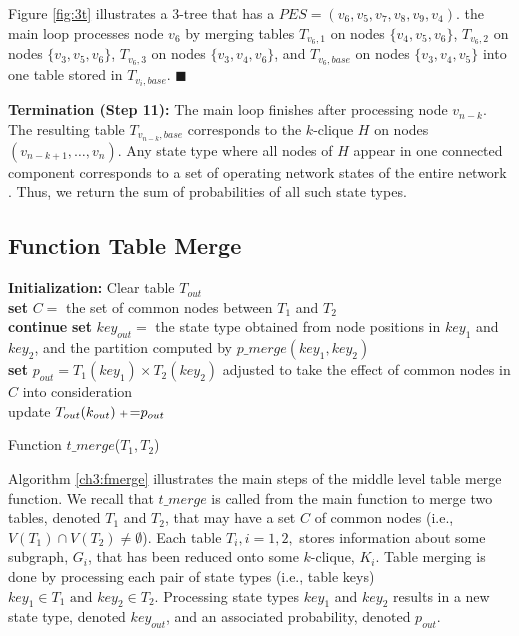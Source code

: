 \begin{example}
\normalfont

Figure \ref{fig:3t} illustrates a 3-tree that has a $PES=(v_6, v_5, v_7, v_8, v_9, v_4)$. the main loop processes node $v_6$ by merging tables $T_{v_6,1}$ on nodes $\{v_4, v_5, v_6\}$, $T_{v_6,2}$ on nodes $\{v_3, v_5, v_6\}$, $T_{v_6,3}$ on nodes $\{v_3, v_4, v_6\}$, and $T_{v_6,base}$ on nodes $\{v_3, v_4, v_5\}$ into one table stored in $T_{v_i,base}$. $\blacksquare$
\end{example}

\textbf{Termination (Step 11):} The main loop finishes after processing node $v_{n-k}$. The resulting table $T_{v_{n-k},base}$  corresponds to the $k$-clique $H$ on nodes $(v_{n-k+1}, \ldots, v_n)$. Any state type where all nodes of $H$ appear in one connected component corresponds to a set of operating network states of the entire network . Thus, we return the sum of probabilities of all such state types.


\subsection{Function Table Merge}
\label{subsub:Mrg}
\begin{algorithm}[htbd]
\Indm  
{}
\nwline
\Indp
\nl \textbf{Initialization:} Clear table $T_{out}$\\
\nl \textbf{set} $C=$ the set of common nodes between $T_1$ and $T_2$\\
 \nl {}
 {
 \nl {} {
 \nl\textbf{ continue}}
 \nl \textbf{set} $key_{out}=$ the state type obtained from node positions in $key_1$ and $key_2$,
   and the partition computed by $p\_merge(key_1,key_2)$\\
 \nl \textbf{set} $p_{out}=T_1(key_1)\times T_2(key_2)$ adjusted to take the effect of common nodes in 
   $C$ into consideration\\
 \nl {} {
\nl update $T_{out}(k_{out}){\;{\scriptstyle +} \! =} p_{out}$ 
 }
  }
  
\nl {}
 \caption{Function $t\_merge$($T_1,T_2$)}
 \label{ch3:fmerge}
\end{algorithm}

Algorithm \ref{ch3:fmerge} illustrates the main steps of the middle level table merge function. We recall that $t\_merge$ is called from the main function to merge two tables, denoted $T_1$ and $T_2$, that may have a set $C$ of common nodes (i.e., $V(T_1) \cap V(T_2) \neq \emptyset$).
Each table $T_i, i=1, 2,$ stores information about some subgraph, $G_i$, that has been reduced onto some $k$-clique, $K_i$. 
Table merging is done by processing each pair of state types (i.e., table keys) $key_1 \in T_1 \mbox{ and } key_2 \in T_2$. Processing state types $key_1$ and $key_2$ results in a new state type, denoted $key_{out}$, and an associated probability, denoted $p_{out}$. \\


